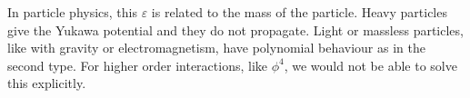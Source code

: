 In particle physics, this $\varepsilon$ is related to the mass of the particle. Heavy particles give the Yukawa potential and they do not propagate. Light or massless particles, like with gravity or electromagnetism, have polynomial behaviour as in the second type.
For higher order interactions, like $\phi^4$, we would not be able to solve this explicitly.
